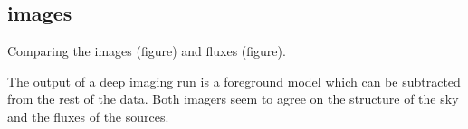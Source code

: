 \subsection{images}
Comparing the images (figure) and fluxes (figure). 

The output of a deep imaging run is a foreground model which can be subtracted from the rest of the data. Both imagers seem to agree on the structure of the sky and the fluxes of the sources.

